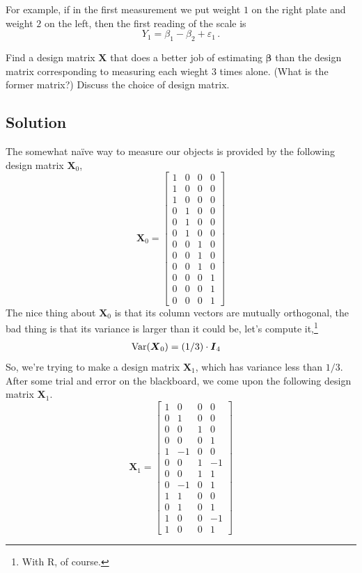 \documentclass{amsart}
\newcommand{\var}{{\rm Var}}
\newcommand{\ep}{\varepsilon}
\newcommand{\bvec}[1]{{\boldsymbol #1}}
\begin{document}
			For example, if in the first measurement we put weight $1$ on the right plate and weight $2$ on the left, then the first reading of the scale is $$Y_{1} = \beta_{1} - \beta_{2}+ \ep_{1} \,.$$

			Find a design matrix $\bvec{X}$ that does a better job of estimating $\bvec{\beta}$ than the design matrix corresponding to measuring each wieght $3$ times alone. 
			(What is the former matrix?)  Discuss the choice of design matrix.

		\subsection{Solution} %
		\label{sub:solution3}
			The somewhat na\"ive way to measure our objects is provided by the following design matrix $\bvec{X}_{0}$,
				$$\bvec{X}_{0} = \begin{bmatrix}
					1 & 0 & 0 & 0 \\
					1 & 0 & 0 & 0 \\
					1 & 0 & 0 & 0 \\
					0 & 1 & 0 & 0 \\
					0 & 1 & 0 & 0 \\
					0 & 1 & 0 & 0 \\
					0 & 0 & 1 & 0 \\
					0 & 0 & 1 & 0 \\
					0 & 0 & 1 & 0 \\
					0 & 0 & 0 & 1 \\
					0 & 0 & 0 & 1 \\
					0 & 0 & 0 & 1
				\end{bmatrix}$$
			The nice thing about $\bvec{X}_{0}$ is that its column vectors are mutually orthogonal, the bad thing is that its variance is larger than it could be, let's compute it,\footnote{With R, of course.}
				\begin{align*}
					\var(\bvec{X}_{0}) &= (1/3)\cdot\bvec{I}_{4}
				\end{align*}
			So, we're trying to make a design matrix $\bvec{X}_{1}$, which has variance less than $1/3$. 
			After some trial and error on the blackboard, we come upon the following design matrix $\bvec{X}_{1}$.
				$$\bvec{X}_{1} = \begin{bmatrix}
					1 & 0 & 0 & 0 \\
					0 & 1 & 0 & 0 \\
					0 & 0 & 1 & 0 \\
					0 & 0 & 0 & 1 \\
					1 & -1 & 0 & 0 \\
					0 & 0 & 1 & -1 \\
					0 & 0 & 1 & 1 \\
					0 & -1 & 0 & 1 \\
					1 & 1 & 0 & 0 \\
					0 & 1 & 0 & 1 \\
					1 & 0 & 0 & -1 \\
					1 & 0 & 0 & 1
				\end{bmatrix}$$
\end{document}
